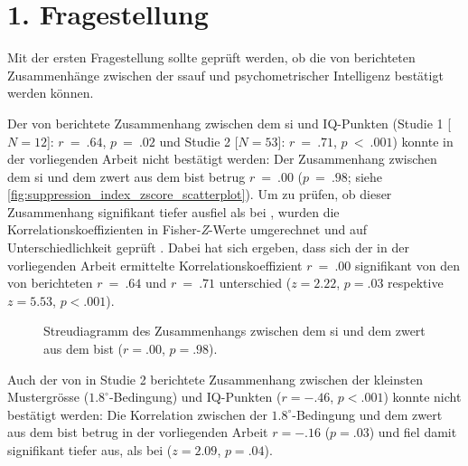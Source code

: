 \documentclass[11pt, twoside, a4paper]{book}		%
\begin{document}
\clearpage
\section{1. Fragestellung}

Mit der ersten Fragestellung sollte geprüft werden, ob die von \citet{Melnick2013} berichteten Zusammenhänge zwischen der \gls{ssauf} und psychometrischer Intelligenz bestätigt werden können. 

Der von \citet{Melnick2013} berichtete Zusammenhang zwischen dem \gls{si} und IQ-Punkten (Studie 1 [$N=12$]: $r~=~.64$, $p~=~.02$ und Studie 2 [$N=53$]: $r~=~.71$, $p~<~.001$) konnte in der vorliegenden Arbeit nicht bestätigt werden: Der Zusammenhang zwischen dem \gls{si} und dem \gls{zwert} aus dem \gls{bist} betrug $r~=~.00$ ($p~=~.98$; siehe \autoref{fig:suppression_index_zscore_scatterplot}). 
Um zu prüfen, ob dieser Zusammenhang signifikant tiefer ausfiel als bei \citeauthor{Melnick2013}, wurden die Korrelationskoeffizienten in Fisher-\textit{Z}-Werte umgerechnet und  auf Unterschiedlichkeit geprüft \citep[][S. 54]{Cohen1983}. 
Dabei hat sich ergeben, dass sich der in der vorliegenden Arbeit ermittelte Korrelationskoeffizient $r~=~.00$ signifikant von den von \citet{Melnick2013} berichteten $r~=~.64$ und $r~=~.71$ unterschied ($z=2.22$, $p=.03$ respektive $z=5.53$, $p<.001$).

\begin{figure}[t]
	\centering
	\begin{adjustbox}{width=1\textwidth}
		
	\end{adjustbox}
	\caption[Zusammenhang zwischen dem \gls{si} und \gls{zwert} des \gls{bist}s]{Streudiagramm des Zusammenhangs zwischen dem \gls{si} und dem \gls{zwert} aus dem \gls{bist} ($r=.00$, $p=.98$).}
	\label{fig:suppression_index_zscore_scatterplot}
\end{figure}

Auch der von \citet{Melnick2013} in Studie 2 berichtete Zusammenhang zwischen der kleinsten Mustergrösse ($1.8^{\circ}$-Bedingung) und IQ-Punkten ($r=-.46$, $p<.001$) konnte nicht bestätigt werden: Die Korrelation zwischen der $1.8^{\circ}$-Bedingung und dem \gls{zwert} aus dem \gls{bist} betrug in der vorliegenden Arbeit $r=-.16$ ($p=.03$) und fiel damit signifikant tiefer aus, als bei \citeauthor{Melnick2013} ($z=2.09$, $p=.04$).
\end{document}
